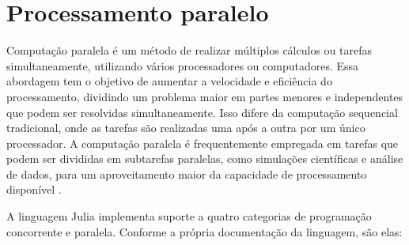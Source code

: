 \section{Processamento paralelo}

Computação paralela é um método de realizar múltiplos cálculos ou tarefas simultaneamente, utilizando vários processadores ou computadores. Essa abordagem tem o objetivo de aumentar a velocidade e eficiência do processamento, dividindo um problema maior em partes menores e independentes que podem ser resolvidas simultaneamente. Isso difere da computação sequencial tradicional, onde as tarefas são realizadas uma após a outra por um único processador. A computação paralela é frequentemente empregada em tarefas que podem ser divididas em subtarefas paralelas, como simulações científicas e análise de dados, para um aproveitamento maior da capacidade de processamento disponível \cite{sli}.

A linguagem Julia implementa suporte a quatro categorias de programação concorrente e paralela. Conforme a própria documentação da linguagem, são elas:

